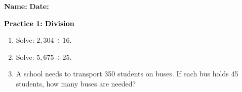 \documentclass[12pt, letterpaper, fleqn]{article}
\begin{document}
\textbf{Name:} \underline{\hspace{5cm}}
\hfill
\textbf{Date:} \underline{\hspace{3cm}}\\

\begin{tcolorbox}[colback=customteal!20]
    \large\textcolor{black}{\textbf{Practice 1: Division}}
\end{tcolorbox}
\begin{enumerate}[itemsep=3.5cm, leftmargin=0.6cm]
\item Solve: $2,304 \div 16$.
\vspace{3.5cm}
\item Solve: $5,675 \div 25$.
\vspace{3.5cm}
\item A school needs to transport 350 students on buses. If each bus holds 45 students, how many buses are needed?
\end{enumerate}
\end{document}
